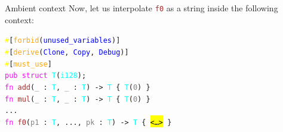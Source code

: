 \documentclass{beamer}
\begin{document}
\begin{frame}{Ambient context}
  \hspace{-0.2cm}Now, let us interpolate \texttt{\textcolor{brown}{f0}} as a string inside the following context:\\\vspace{0.3cm}

\texttt{\frenchspacing\:\textcolor{yellow}{#}[\textcolor{orange}{forbid}(\textcolor{blue}{unused\_variables})]}\\\vspace{0.2cm}
\texttt{\frenchspacing\:\textcolor{yellow}{#}[\textcolor{orange}{derive}(\textcolor{blue}{Clone}, \textcolor{blue}{Copy}, \textcolor{blue}{Debug})]}\\\vspace{0.2cm}
\texttt{\frenchspacing\:\textcolor{yellow}{#}[\textcolor{orange}{must\_use}]}\\\vspace{0.2cm}
\texttt{\frenchspacing\:\textcolor{magenta}{pub} \textcolor{magenta}{struct} \textcolor{cyan}{T}(\textcolor{cyan}{i128});}\\\vspace{0.2cm}
\texttt{\frenchspacing\:\textcolor{magenta}{fn}  \textcolor{brown}{add}(\textcolor{gray}{\_} : \textcolor{cyan}{T}, \textcolor{gray}{\_} : \textcolor{cyan}{T}) -> \:\textcolor{cyan}{T} \{ \textcolor{cyan}{T}(\textcolor{gray}{0}) \}}\\\vspace{0.2cm}
\texttt{\frenchspacing\:\textcolor{magenta}{fn}  \textcolor{brown}{mul}(\textcolor{gray}{\_} : \textcolor{cyan}{T}, \textcolor{gray}{\_} : \textcolor{cyan}{T}) -> \:\textcolor{cyan}{T} \{ \textcolor{cyan}{T}(\textcolor{gray}{0}) \}}\\\vspace{0.2cm}
\texttt{...}\\\vspace{0.2cm}
\texttt{\frenchspacing\:\textcolor{magenta}{fn}  \textcolor{brown}{f0}(\textcolor{gray}{p1} : \textcolor{cyan}{T}, ..., \textcolor{gray}{pk} : \textcolor{cyan}{T}) -> \:\textcolor{cyan}{T} \{ \hl{<\ldots>} \}}\\\vspace{0.2cm}
\end{frame}
\end{document}

